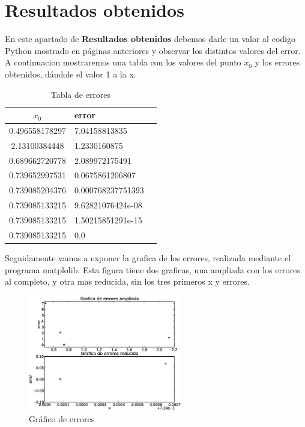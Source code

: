 \section{Resultados obtenidos}
En este apartado de {\bf Resultados obtenidos} debemos darle un valor al codigo Python mostrado en páginas anteriores y observar los distintos valores del error. A continuacion mostraremos una tabla con los valores del punto $x_0$ y los errores obtenidos, dándole el valor 1 a la x.
\begin{table}[!ht]
\begin{center}
\begin{tabular}{|c|l|l|}
\hline
     $x_0$     &      error        \\ \hline
0.496558178297 & 7.04158813835     \\ \hline
2.13100384448  & 1.2330160875      \\ \hline
0.689662720778 & 2.089972175491    \\ \hline
0.739652997531 & 0.0675861206807   \\ \hline
0.739085204376 & 0.000768237751393 \\ \hline
0.739085133215 & 9.62821076424e-08 \\ \hline
0.739085133215 & 1.50215851291e-15 \\ \hline
0.739085133215 & 0.0               \\ \hline

\end{tabular}
\end{center}
\caption{Tabla de errores}
\end{table}

Seguidamente vamos a exponer la grafica de los errores, realizada mediante el programa matplolib. Esta figura tiene dos graficas, una ampliada con los errores al completo, y otra mas reducida, sin los tres primeros x y errores.
\begin{figure}[!th]
\begin{center}
\includegraphics[width=0.6\textwidth]{images/Grafica_de_errores.eps}
\caption{Gráfico de errores}
\end{center}
\end{figure}

